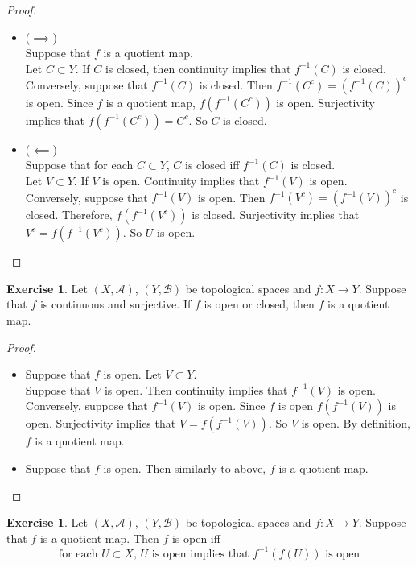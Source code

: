 \documentclass[12pt]{amsart}
\theoremstyle{definition}
\newtheorem{ex}[definition]{Exercise}
\newcommand{\MA}{\mathcal{A}}
\newcommand{\MB}{\mathcal{B}}
\newcommand{\lex}[1]{\label{ex:#1}}
\begin{document}
	\begin{proof}\
	\begin{itemize}
	\item ($\implies$) \\
	Suppose that $f$ is a quotient map.\\
	Let $C \subset Y$. If $C$ is closed, then continuity implies that $f^{-1}(C)$ is closed.\\ 
	Conversely, suppose that $f^{-1}(C)$ is closed. Then $f^{-1}(C^c) = (f^{-1}(C))^c$ is open. Since $f$ is a quotient map, $f(f^{-1}(C^c))$ is open. Surjectivity implies that $f(f^{-1}(C^c)) = C^c$. So $C$ is closed. 
	\item ($\impliedby$) \\
	Suppose that for each $C \subset Y$, $C$ is closed iff $f^{-1}(C)$ is closed. \\
	Let $V \subset Y$. If $V$ is open. Continuity implies that $f^{-1}(V)$ is open.\\ 
	Conversely, suppose that $f^{-1}(V)$ is open. Then $ f^{-1}(V^c) = (f^{-1}(V))^c$ is closed. Therefore, $f(f^{-1}(V^c))$ is closed. Surjectivity implies that $V^c = f(f^{-1}(V^c))$. So $U$ is open.
	\end{itemize}
	\end{proof}
	
	\begin{ex} \lex{34004}
	Let $(X, \MA)$, $(Y, \MB)$ be topological spaces and $f:X \rightarrow Y$. Suppose that $f$ is continuous and surjective. If $f$ is open or closed, then $f$ is a quotient map. 
	\end{ex}
	
	\begin{proof}\
	\begin{itemize}	
	\item Suppose that $f$ is open. Let $V \subset Y$. \\
	Suppose that $V$ is open. Then continuity implies that $f^{-1}(V)$ is open. Conversely, suppose that $f^{-1}(V)$ is open. Since $f$ is open $f(f^{-1}(V))$ is open. Surjectivity implies that $V = f(f^{-1}(V))$. So $V$ is open. By definition, $f$ is a quotient map.\\
	\item   
	Suppose that $f$ is open. Then similarly to above, $f$ is a quotient map.
	\end{itemize}
	\end{proof}
	
	\begin{ex} \lex{34005}
	Let $(X, \MA)$, $(Y, \MB)$ be topological spaces and $f:X \rightarrow Y$. Suppose that $f$ is a quotient map. Then $f$ is open iff 
	\begin{equation*}
	\text{for each $U \subset X$, $U$ is open implies that $f^{-1}(f(U))$ is open} 
	\end{equation*}
	\end{ex}
	
\end{document}
